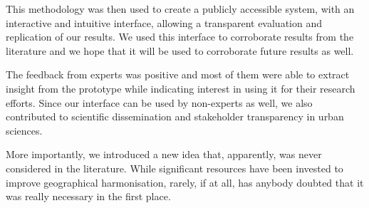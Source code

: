 \documentclass[10pt,letterpaper]{article}
\newcommand{\censure}[1]{}
\newcommand{\revision}[1]{\marginpar{\quad ---}\protect{\color{blue}{#1}}}
\begin{document}
This methodology was then used to create a publicly accessible system, with an
interactive and intuitive interface, allowing a transparent evaluation and
replication of our results. We used this interface to corroborate results from
the literature and we hope that it will be used to corroborate future results as
well. 

The feedback from experts was positive and most of them were able to extract
insight from the prototype while indicating interest in using it for their
research efforts.  Since our interface can be used by non-experts as well, we
also contributed to scientific dissemination and stakeholder transparency in
urban sciences.


More importantly, we introduced a new idea that, apparently, was never
considered in the literature. While significant resources have been invested to
improve geographical harmonisation, rarely, if at all, has anybody doubted that
it was really necessary in the first place. \revision{We proved that it is not
necessary for regionalisation, especially for neighbourhood effects and
neighbourhood dynamics.}

\censure{
\section*{Acknowledgement}
This research was supported by a University of Toronto Connaught Global
Challenge grant and is part of the Urban Genome Project. The authors thank Cary
Wu, Ethan Fosse, Fernando Calderón Figueroa, Patrick Adler, and James Murdoch
for their expert opinions; Mark S. Fox, Robert M. Wright, Ultan Byrne, Matti
Siemiatycki, Shauna Brail, Jeff Allen, Steven Farber, and Richard Florida for
general guidance and support; and the anonymous reviewers for their constructive
comments.}



\end{document}
